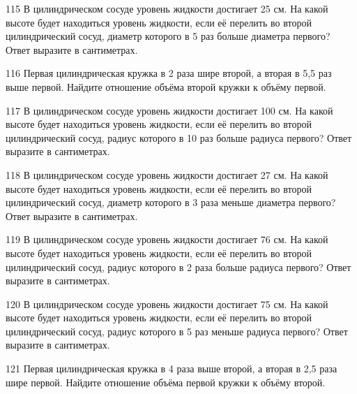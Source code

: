 \documentclass[4apaper]{article}
\begin{document}
\begin{taskBN}{115}
В цилиндрическом сосуде уровень жидкости достигает 25 см. На какой высоте будет находиться уровень жидкости, если её перелить во второй цилиндрический сосуд, диаметр которого в 5 раз больше диаметра первого? Ответ выразите в сантиметрах.
\end{taskBN}

\begin{taskBN}{116}
 Первая цилиндрическая кружка в 2 раза шире второй, а вторая в 5,5 раз выше первой. Найдите отношение объёма второй кружки к объёму первой.
\end{taskBN}

\begin{taskBN}{117}
В цилиндрическом сосуде уровень жидкости достигает 100 см. На какой высоте будет находиться уровень жидкости, если её перелить во второй цилиндрический сосуд, радиус которого в 10 раз больше радиуса первого? Ответ выразите в сантиметрах.
\end{taskBN}

\begin{taskBN}{118}
В цилиндрическом сосуде уровень жидкости достигает 27 см. На какой высоте будет находиться уровень жидкости, если её перелить во второй цилиндрический сосуд, диаметр которого в 3 раза меньше диаметра первого? Ответ выразите в сантиметрах.
\end{taskBN}

\begin{taskBN}{119}
В цилиндрическом сосуде уровень жидкости достигает 76 см. На какой высоте будет находиться уровень жидкости, если её перелить во второй цилиндрический сосуд, радиус которого в 2 раза больше радиуса первого? Ответ выразите в сантиметрах.
\end{taskBN}

\begin{taskBN}{120}
В цилиндрическом сосуде уровень жидкости достигает 75 см. На какой высоте будет находиться уровень жидкости, если её перелить во второй цилиндрический сосуд, радиус которого в 5 раз меньше радиуса первого? Ответ выразите в сантиметрах.
\end{taskBN}

\begin{taskBN}{121}
 Первая цилиндрическая кружка в 4 раза выше второй, а вторая в 2,5 раза шире первой. Найдите отношение объёма первой кружки к объёму второй.
\end{taskBN}
\end{document}
